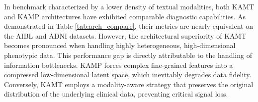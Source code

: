 \documentclass[lettersize,journal]{IEEEtran}
\begin{document}
    In benchmark characterized by a lower density of textual modalities, both KAMT and KAMP architectures have exhibited comparable diagnostic capabilities. As demonstrated in Table \ref{tab:arch_compare}, their metrics are nearly equivalent on the AIBL and ADNI datasets. However, the architectural superiority of KAMT becomes pronounced when handling highly heterogeneous, high-dimensional phenotypic data. This performance gap is directly attributable to the handling of information bottlenecks. KAMP forces complex fine-grained features into a compressed low-dimensional latent space, which inevitably degrades data fidelity. Conversely, KAMT employs a modality-aware strategy that preserves the original distribution of the underlying clinical data, preventing critical signal loss.

\end{document}
